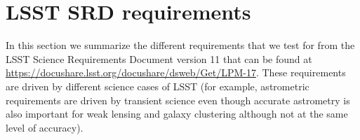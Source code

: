 \documentclass[a4paper,fleqn,usenatbib]{mnras}
\begin{document}
\appendix



\section{LSST SRD requirements}
\label{app:lsst_srd}
In this section we summarize the different requirements that we test for from the LSST Science Requirements Document version 11 that can be found at \url{https://docushare.lsst.org/docushare/dsweb/Get/LPM-17}. These requirements are driven by different science cases of LSST (for example, astrometric requirements are driven by transient science even though accurate astrometry is also important for weak lensing and galaxy clustering although not at the same level of accuracy).
\end{document}
